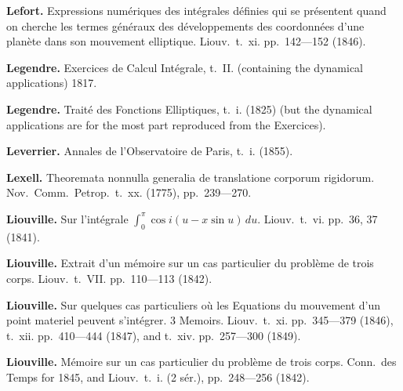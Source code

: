\documentclass[12pt,a4paper]{article}
\theoremstyle{definition}
\begin{document}
\noindent\textbf{Lefort.} Expressions num\'{e}riques des int\'{e}grales d\'{e}finies qui se pr\'{e}sentent quand on cherche les termes g\'{e}n\'{e}raux des d\'{e}veloppements des coordonn\'{e}es d'une plan\`{e}te dans son mouvement elliptique. Liouv.~t.~xi. pp.~142---152 (1846).

\vspace{0.5em}

\noindent\textbf{Legendre.} Exercices de Calcul Int\'{e}grale, t.~II. (containing the dynamical applications) 1817.

\vspace{0.5em}

\noindent\textbf{Legendre.} Trait\'{e} des Fonctions Elliptiques, t.~i. (1825) (but the dynamical applications are for the most part reproduced from the Exercices).

\vspace{0.5em}

\noindent\textbf{Leverrier.} Annales de l'Observatoire de Paris, t.~i. (1855).

\vspace{0.5em}

\noindent\textbf{Lexell.} Theoremata nonnulla generalia de translatione corporum rigidorum. Nov.~Comm.~Petrop.~t.~xx. (1775), pp.~239---270.

\vspace{0.5em}

\noindent\textbf{Liouville.} Sur l'int\'{e}grale $\int_0^\pi \cos i(u - x \sin u)\, du$. Liouv.~t.~vi. pp.~36, 37 (1841).

\vspace{0.5em}

\noindent\textbf{Liouville.} Extrait d'un m\'{e}moire sur un cas particulier du probl\`{e}me de trois corps. Liouv.~t.~VII. pp.~110---113 (1842).

\vspace{0.5em}

\noindent\textbf{Liouville.} Sur quelques cas particuliers o\`{u} les Equations du mouvement d'un point materiel peuvent s'int\'{e}grer. 3 Memoirs. Liouv.~t.~xi. pp.~345---379 (1846), t.~xii. pp.~410---444 (1847), and t.~xiv. pp.~257---300 (1849).

\vspace{0.5em}

\noindent\textbf{Liouville.} M\'{e}moire sur un cas particulier du probl\`{e}me de trois corps. Conn.~des Temps for 1845, and Liouv.~t.~i. (2 s\'{e}r.), pp.~248---256 (1842).
\end{document}

